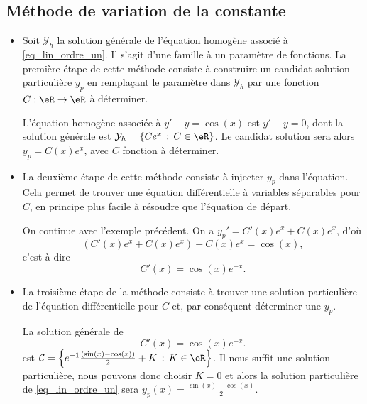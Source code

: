 \subsection{Méthode de variation de la constante}

\begin{itemize}
\item Soit $\mathcal{Y}_h$ la solution générale de l'équation homogène associé à \eqref{eq_lin_ordre_un}. Il s'agit d'une famille à un paramètre de fonctions. La première étape de cette méthode consiste à construire un candidat solution particulière $y_p$ en remplaçant le paramètre dans  $\mathcal{Y}_h$ par une fonction $C: \eR \to\eR$ à déterminer.

  \begin{example}
    L'équation homogène associée à $y'-y = \cos(x)$ est $y' - y = 0$, dont la solution générale est $\mathcal{Y}_h = \{Ce^x \,:\, C\in\eR\}$. Le candidat solution sera alors $y_p = C(x)e^x$, avec $C$ fonction à déterminer.
  \end{example}

 \item  La deuxième étape de cette méthode consiste à injecter $y_p$ dans l'équation. Cela permet de trouver une équation différentielle  à variables séparables pour $C$, en principe plus facile à résoudre que l'équation de départ.

  \begin{example}
    On continue avec l'exemple précédent. On a $y_p' = C'(x) e^x + C(x) e^x$, d'où
    \[
    (C'(x) e^x + C(x) e^x) - C(x) e^x = \cos(x),
    \]
    c'est à dire
    \[
    C'(x)  = \cos(x)e^{-x}.
    \]
  \end{example}
\item  La troisième étape de la méthode consiste à trouver une solution particulière de l'équation différentielle pour $C$ et, par conséquent déterminer une $y_p$.

  \begin{example}
    La solution générale de
    \[
    C'(x)  = \cos(x)e^{-x}.
    \]
    est $\mathcal{C} = \left\{e^{-1}\frac{(\sin(x)-\cos(x))}{2} +K \,:\, K\in\eR\right\}$. Il nous suffit une solution particulière, nous pouvons donc choisir $K=0$ et alors la solution particulière de \eqref{eq_lin_ordre_un} sera $y_p (x)= \frac{\sin(x)-\cos(x)}{2} $.
  \end{example}
\end{itemize}
